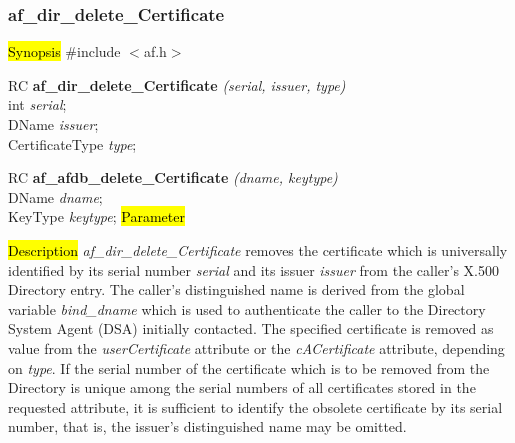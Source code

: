 \subsubsection{af\_dir\_delete\_Certificate}
\hl{Synopsis}
\#include $<$af.h$>$ 

RC {\bf af\_dir\_delete\_Certificate} {\em (serial, issuer, type)} \\
int {\em serial}; \\
DName {\em *issuer}; \\
CertificateType {\em type}; 

RC {\bf af\_afdb\_delete\_Certificate} {\em (dname, keytype)} \\
DName {\em *dname}; \\
KeyType {\em keytype};
\hl{Parameter}





\hl{Description}
{\em af\_dir\_delete\_Certificate} removes the certificate which is universally 
identified by its serial number {\em serial} and its issuer {\em issuer} from the 
caller's X.500 Directory entry. The caller's distinguished name is derived from
the global variable {\em bind\_dname} which is used to authenticate the caller to the
Directory System Agent (DSA) initially contacted.
The specified certificate is removed as value from the
{\em userCertificate} attribute or the {\em cACertificate} attribute, depending
on {\em type}.
If the serial number of the certificate which is to be removed from the Directory 
is unique among the serial numbers of all certificates stored in the requested attribute, 
it is sufficient to identify the obsolete certificate by its serial number, that is, 
the issuer's distinguished name may be omitted.

